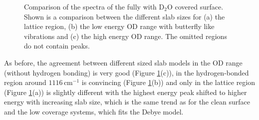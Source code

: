 \documentclass[11pt,DIV=13,BCOR=5mm,a4paper,headinclude]{scrbook}
\begin{document}
 \begin{figure} [!h]
 \centering
              \quad
              \quad
 \caption{Comparison of the spectra of the fully with D$_2$O covered surface.
Shown is a comparison between the different slab sizes for (a) the lattice region, (b) the low energy OD range with butterfly like vibrations and (c) the high energy OD range.
The omitted regions do not contain peaks.} 
        \label{abb:fullyhydrox_spec}
\end{figure}
As before, the agreement between different sized slab models in the OD range (without hydrogen bonding) is very good (Figure \ref{abb:fullyhydrox_spec}(c)), in the hydrogen-bonded region around $1116\,$cm$^{-1}$ is convincing (Figure \ref{abb:fullyhydrox_spec}(b)) and only in the lattice region (Figure \ref{abb:fullyhydrox_spec}(a)) is slightly different with the highest energy peak shifted to higher energy with increasing slab size, which is the same trend as for the clean surface and the low coverage systems, which fits the Debye model.
\\\\
\end{document}
